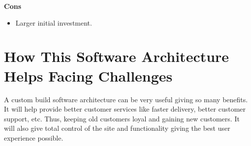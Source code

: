 \documentclass{book}
\begin{document}
\textbf{Cons}
\begin{itemize}
\item Larger initial investment.
\end{itemize}

\section{How This Software Architecture Helps Facing Challenges}
A custom build software architecture can be very useful giving so many benefits. It will help provide better customer services like faster delivery, better customer support, etc. Thus, keeping old customers loyal and gaining new customers. It will also give total control of the site and functionality giving the best user experience possible.
\end{document}
